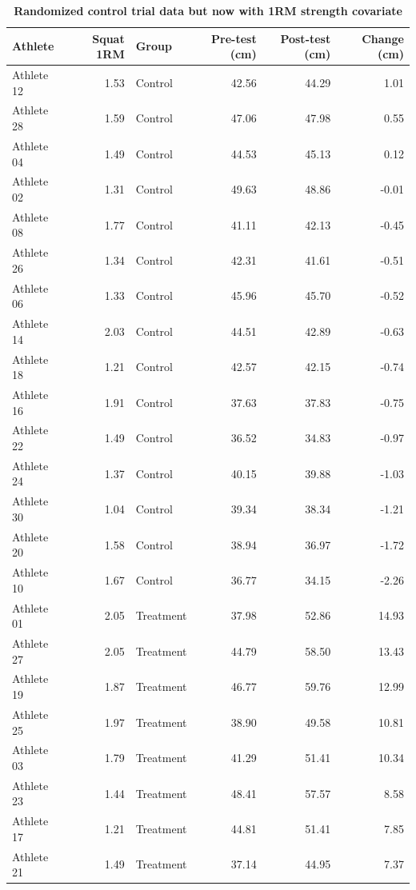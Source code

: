 \documentclass[
]{book}
\begin{document}
\begin{table}

\caption{\label{tab:rct-data-with-squat}\textbf{Randomized control trial data but now with 1RM strength covariate}}
\centering
\begin{tabular}[t]{lrlrrr}
\toprule
Athlete & Squat 1RM & Group & Pre-test (cm) & Post-test (cm) & Change (cm)\\
\midrule
Athlete 12 & 1.53 & Control & 42.56 & 44.29 & 1.01\\
Athlete 28 & 1.59 & Control & 47.06 & 47.98 & 0.55\\
Athlete 04 & 1.49 & Control & 44.53 & 45.13 & 0.12\\
Athlete 02 & 1.31 & Control & 49.63 & 48.86 & -0.01\\
Athlete 08 & 1.77 & Control & 41.11 & 42.13 & -0.45\\
\addlinespace
Athlete 26 & 1.34 & Control & 42.31 & 41.61 & -0.51\\
Athlete 06 & 1.33 & Control & 45.96 & 45.70 & -0.52\\
Athlete 14 & 2.03 & Control & 44.51 & 42.89 & -0.63\\
Athlete 18 & 1.21 & Control & 42.57 & 42.15 & -0.74\\
Athlete 16 & 1.91 & Control & 37.63 & 37.83 & -0.75\\
\addlinespace
Athlete 22 & 1.49 & Control & 36.52 & 34.83 & -0.97\\
Athlete 24 & 1.37 & Control & 40.15 & 39.88 & -1.03\\
Athlete 30 & 1.04 & Control & 39.34 & 38.34 & -1.21\\
Athlete 20 & 1.58 & Control & 38.94 & 36.97 & -1.72\\
Athlete 10 & 1.67 & Control & 36.77 & 34.15 & -2.26\\
\addlinespace
Athlete 01 & 2.05 & Treatment & 37.98 & 52.86 & 14.93\\
Athlete 27 & 2.05 & Treatment & 44.79 & 58.50 & 13.43\\
Athlete 19 & 1.87 & Treatment & 46.77 & 59.76 & 12.99\\
Athlete 25 & 1.97 & Treatment & 38.90 & 49.58 & 10.81\\
Athlete 03 & 1.79 & Treatment & 41.29 & 51.41 & 10.34\\
\addlinespace
Athlete 23 & 1.44 & Treatment & 48.41 & 57.57 & 8.58\\
Athlete 17 & 1.21 & Treatment & 44.81 & 51.41 & 7.85\\
Athlete 21 & 1.49 & Treatment & 37.14 & 44.95 & 7.37\\

\end{tabular}
\end{table}
\end{document}

